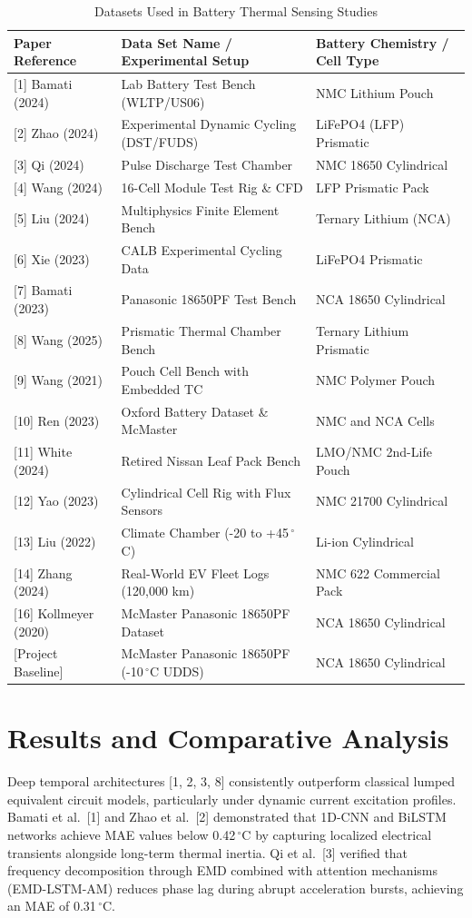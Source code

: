 \documentclass[conference]{IEEEtran}
\begin{document}
\begin{table}[htbp]
\caption{Datasets Used in Battery Thermal Sensing Studies}
\label{tab:datasets}
\centering
\scriptsize
\begin{tabular}{@{}lll@{}}
\toprule
\textbf{Paper Reference} & \textbf{Data Set Name / Experimental Setup} & \textbf{Battery Chemistry / Cell Type} \\ \midrule
{[1] Bamati (2024)} & Lab Battery Test Bench (WLTP/US06) & NMC Lithium Pouch \\
{[2] Zhao (2024)} & Experimental Dynamic Cycling (DST/FUDS) & LiFePO4 (LFP) Prismatic \\
{[3] Qi (2024)} & Pulse Discharge Test Chamber & NMC 18650 Cylindrical \\
{[4] Wang (2024)} & 16-Cell Module Test Rig \& CFD & LFP Prismatic Pack \\
{[5] Liu (2024)} & Multiphysics Finite Element Bench & Ternary Lithium (NCA) \\
{[6] Xie (2023)} & CALB Experimental Cycling Data & LiFePO4 Prismatic \\
{[7] Bamati (2023)} & Panasonic 18650PF Test Bench & NCA 18650 Cylindrical \\
{[8] Wang (2025)} & Prismatic Thermal Chamber Bench & Ternary Lithium Prismatic \\
{[9] Wang (2021)} & Pouch Cell Bench with Embedded TC & NMC Polymer Pouch \\
{[10] Ren (2023)} & Oxford Battery Dataset \& McMaster & NMC and NCA Cells \\
{[11] White (2024)} & Retired Nissan Leaf Pack Bench & LMO/NMC 2nd-Life Pouch \\
{[12] Yao (2023)} & Cylindrical Cell Rig with Flux Sensors & NMC 21700 Cylindrical \\
{[13] Liu (2022)} & Climate Chamber (-20 to +45\,$^\circ$C) & Li-ion Cylindrical \\
{[14] Zhang (2024)} & Real-World EV Fleet Logs (120,000 km) & NMC 622 Commercial Pack \\
{[16] Kollmeyer (2020)} & McMaster Panasonic 18650PF Dataset & NCA 18650 Cylindrical \\ \midrule
{[Project Baseline]} & McMaster Panasonic 18650PF (-10\,$^\circ$C UDDS) & NCA 18650 Cylindrical \\ \bottomrule
\end{tabular}
\end{table}

\section{Results and Comparative Analysis}
Deep temporal architectures [1, 2, 3, 8] consistently outperform classical lumped equivalent circuit models, particularly under dynamic current excitation profiles. Bamati et al.~[1] and Zhao et al.~[2] demonstrated that 1D-CNN and BiLSTM networks achieve MAE values below 0.42\,$^\circ$C by capturing localized electrical transients alongside long-term thermal inertia. Qi et al.~[3] verified that frequency decomposition through EMD combined with attention mechanisms (EMD-LSTM-AM) reduces phase lag during abrupt acceleration bursts, achieving an MAE of 0.31\,$^\circ$C.
\end{document}
